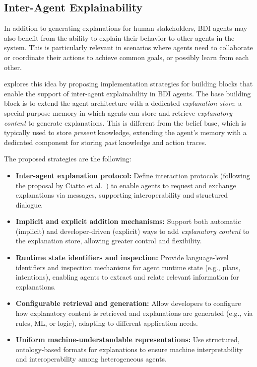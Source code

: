 \subsection{Inter-Agent Explainability}

In addition to generating explanations for human stakeholders, \ac{BDI} agents may also benefit from the ability to explain their behavior to other agents in the system.
%
This is particularly relevant in scenarios where agents need to collaborate or coordinate their actions to achieve common goals, or possibly learn from each other. 

\cite{beaumont2025engineering} explores this idea by proposing implementation strategies for building blocks that enable the support of inter-agent explainability in \ac{BDI} agents.
%
The base building block is to extend the agent architecture with a dedicated \emph{explanation store}: a special purpose memory in which agents can store and retrieve \emph{explanatory content} to generate explanations.
%
This is different from the belief base, which is typically used to store \emph{present} knowledge, extending the agent's memory with a dedicated component for storing \emph{past} knowledge and action traces.

The proposed strategies are the following: 
\begin{itemize}
    \item \textbf{Inter-agent explanation protocol:} Define interaction protocols (following the proposal by Ciatto et al.\ \cite{ciatto2023general}) to enable agents to request and exchange explanations via messages, supporting interoperability and structured dialogue.
    \item \textbf{Implicit and explicit addition mechanisms:} Support both automatic (implicit) and developer-driven (explicit) ways to add \emph{explanatory content} to the explanation store, allowing greater control and flexibility.
    \item \textbf{Runtime state identifiers and inspection:} Provide language-level identifiers and inspection mechanisms for agent runtime state (e.g., plans, intentions), enabling agents to extract and relate relevant information for explanations.
    \item \textbf{Configurable retrieval and generation:} Allow developers to configure how explanatory content is retrieved and explanations are generated (e.g., via rules, ML, or logic), adapting to different application needs.
    \item \textbf{Uniform machine-understandable representations:} Use structured, ontology-based formats for explanations to ensure machine interpretability and interoperability among heterogeneous agents.
\end{itemize}

